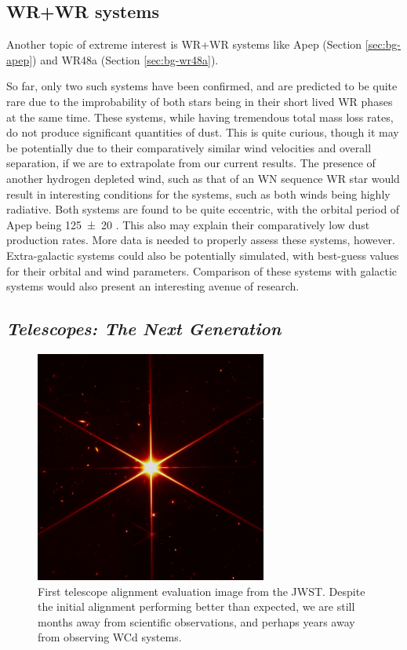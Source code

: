 \subsection{WR+WR systems}

Another topic of extreme interest is WR+WR systems like Apep (Section \ref{sec:bg-apep}) and WR48a (Section \ref{sec:bg-wr48a}).

So far, only two such systems have been confirmed, and are predicted to be quite rare due to the improbability of both stars being in their short lived WR phases at the same time.
These systems, while having tremendous total mass loss rates, do not produce significant quantities of dust.
This is quite curious, though it may be potentially due to their comparatively similar wind velocities and overall separation, if we are to extrapolate from our current results.
The presence of another hydrogen depleted wind, such as that of an WN sequence WR star would result in interesting conditions for the systems, such as both winds being highly radiative.
Both systems are found to be quite eccentric, with the orbital period of Apep being \SI{125(20)}{\year} \parencite{hanExtremeCollidingwindSystem2020}.
This also may explain their comparatively low dust production rates.
More data is needed to properly assess these systems, however.
Extra-galactic systems could also be potentially simulated, with best-guess values for their orbital and wind parameters.
Comparison of these systems with galactic systems would also present an interesting avenue of research.

\subsection{\emph{Telescopes: The Next Generation}}

\begin{figure}
  \centering
  \includegraphics[width=3in]{assets/jwst.jpg}
  \caption[First telescope alignment evaluation image from the JWST]{First telescope alignment evaluation image from the JWST. Despite the initial alignment performing better than expected, we are still months away from scientific observations, and perhaps years away from observing WCd systems.}
  \label{fig:jwst}
\end{figure}

